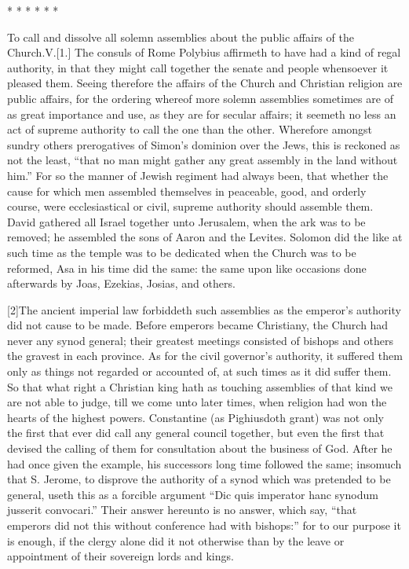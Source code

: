 * * * * * *

To call and dissolve all solemn assemblies about the public affairs of the Church.V.[1.] The consuls of Rome Polybius affirmeth to have had a kind of regal authority, in that they might call together the senate and people whensoever it pleased them. Seeing therefore the affairs of the Church and Christian religion are public affairs, for the ordering whereof more solemn assemblies sometimes are of as great importance and use, as they are for secular affairs; it seemeth no less an act of supreme authority to call the one than the other. Wherefore amongst sundry others prerogatives of Simon’s dominion over the Jews, this is reckoned as not the least, “that no man might gather any great assembly in the land without him.” For so the manner of Jewish regiment had always been, that whether the cause for which men assembled themselves in peaceable, good, and orderly course, were ecclesiastical or civil, supreme authority should assemble them. David gathered all Israel together unto Jerusalem, when the ark was to be removed; he assembled the sons of Aaron and the Levites. Solomon did the like at such time as the temple was to be dedicated when the Church was to be reformed, Asa in his time did the same: the same upon like occasions done afterwards by Joas, Ezekias, Josias, and others.

[2]The ancient imperial law forbiddeth such assemblies  as the emperor’s authority did not cause to be made. Before emperors became Christiany, the Church had never any synod general; their greatest meetings consisted of bishops and others the gravest in each province. As for the civil governor’s authority, it suffered them only as things not regarded or accounted of, at such times as it did suffer them. So that what right a Christian king hath as touching assemblies of that kind we are not able to judge, till we come unto later times, when religion had won the hearts of the highest powers. Constantine (as Pighiusdoth grant) was not only the first that ever did call any general council together, but even the first that devised the calling of them for consultation about the business of God. After he had once given the example, his successors long time followed the same; insomuch that S. Jerome, to disprove the authority of a synod which was pretended to be general, useth this as a forcible argument “Dic quis imperator hanc synodum jusserit convocari.” Their answer hereunto is no answer, which say, “that emperors did not this without conference had with  bishops:” for to our purpose it is enough, if the clergy alone did it not otherwise than by the leave or appointment of their sovereign lords and kings.

